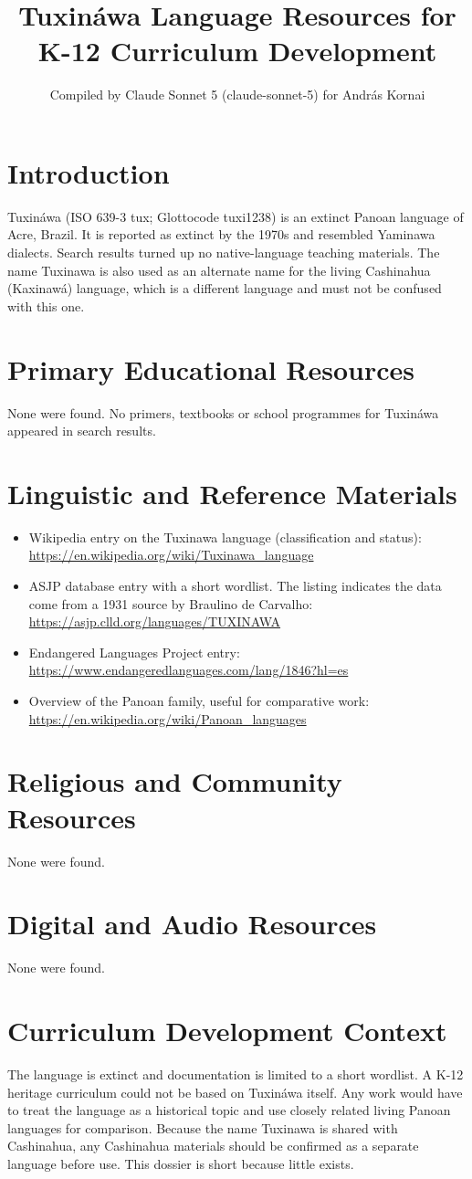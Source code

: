 \documentclass[12pt]{article}
\title{Tuxin\'awa Language Resources for K-12 Curriculum Development}
\author{Compiled by Claude Sonnet 5 (claude-sonnet-5) for Andr\'as Kornai}
\date{}
\begin{document}
\maketitle

\section{Introduction}
Tuxin\'awa (ISO 639-3 tux; Glottocode tuxi1238) is an extinct Panoan language of Acre, Brazil. It is reported as extinct by the 1970s and resembled Yaminawa dialects. Search results turned up no native-language teaching materials. The name Tuxinawa is also used as an alternate name for the living Cashinahua (Kaxinaw\'a) language, which is a different language and must not be confused with this one.

\section{Primary Educational Resources}
None were found. No primers, textbooks or school programmes for Tuxin\'awa appeared in search results.

\section{Linguistic and Reference Materials}
\begin{itemize}
\item Wikipedia entry on the Tuxinawa language (classification and status): \url{https://en.wikipedia.org/wiki/Tuxinawa_language}
\item ASJP database entry with a short wordlist. The listing indicates the data come from a 1931 source by Braulino de Carvalho: \url{https://asjp.clld.org/languages/TUXINAWA}
\item Endangered Languages Project entry: \url{https://www.endangeredlanguages.com/lang/1846?hl=es}
\item Overview of the Panoan family, useful for comparative work: \url{https://en.wikipedia.org/wiki/Panoan_languages}
\end{itemize}

\section{Religious and Community Resources}
None were found.

\section{Digital and Audio Resources}
None were found.

\section{Curriculum Development Context}
The language is extinct and documentation is limited to a short wordlist. A K-12 heritage curriculum could not be based on Tuxin\'awa itself. Any work would have to treat the language as a historical topic and use closely related living Panoan languages for comparison. Because the name Tuxinawa is shared with Cashinahua, any Cashinahua materials should be confirmed as a separate language before use. This dossier is short because little exists.
\end{document}
